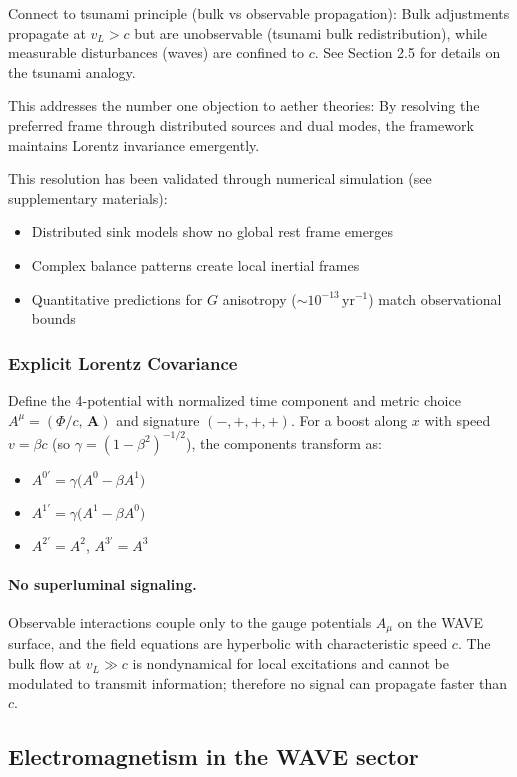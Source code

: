 Connect to tsunami principle (bulk vs observable propagation): Bulk adjustments propagate at $v_L > c$ but are unobservable (tsunami bulk redistribution), while measurable disturbances (waves) are confined to $c$. See Section 2.5 for details on the tsunami analogy.

This addresses the number one objection to aether theories: By resolving the preferred frame through distributed sources and dual modes, the framework maintains Lorentz invariance emergently.

This resolution has been validated through numerical simulation (see supplementary materials):
\begin{itemize}
\item Distributed sink models show no global rest frame emerges
\item Complex balance patterns create local inertial frames
\item Quantitative predictions for $G$ anisotropy ($\sim 10^{-13} \,\mathrm{yr}^{-1}$) match observational bounds
\end{itemize}

\subsubsection{Explicit Lorentz Covariance}
Define the 4-potential with normalized time component and metric choice
$A^\mu=(\Phi/c,\,\mathbf A)$ and signature $(-,+,+,+)$. For a boost along $x$ with speed $v=\beta c$ (so $\gamma=(1-\beta^2)^{-1/2}$), the components transform as:
\begin{itemize}
\item $A^{0'} = \gamma\big(A^0 - \beta A^1\big)$
\item $A^{1'} = \gamma\big(A^1 - \beta A^0\big)$
\item $A^{2'} = A^2$, $A^{3'} = A^3$
\end{itemize}

\paragraph{No superluminal signaling.} Observable interactions couple only to the gauge potentials $A_\mu$ on the WAVE surface, and the field equations are hyperbolic with characteristic speed $c$. The bulk flow at $v_L\gg c$ is nondynamical for local excitations and cannot be modulated to transmit information; therefore no signal can propagate faster than $c$.
\subsection{Electromagnetism in the WAVE sector}
